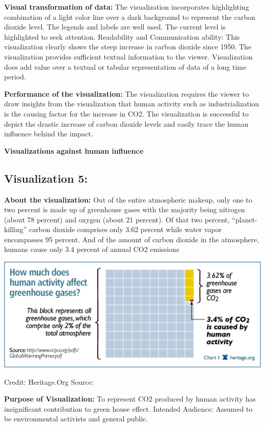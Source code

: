 \documentclass[]{book}
\begin{document}
\textbf{Visual transformation of data:} The visualization incorporates highlighting combination of a light color line over a dark background to represent the carbon dioxide level. The legends and labels are well used. The current level is highlighted to seek attention.
Readability and Communication ability: This visualization clearly shows the steep increase in carbon dioxide since 1950. The visualization provides sufficient textual information to the viewer. Visualization does add value over a textual or tabular representation of data of a long time period.

\textbf{Performance of the visualization:} The visualization requires the viewer to draw insights from the visualization that human activity such as industrialization is the causing factor for the increase in CO2. The visualization is successful to depict the drastic increase of carbon dioxide levels and easily trace the human influence behind the impact.

\textbf{Visualizations against human influence}

\hypertarget{visualization-5}{%
\subsection{Visualization 5:}\label{visualization-5}}

\textbf{About the visualization:} Out of the entire atmospheric makeup, only one to two percent is made up of greenhouse gases with the majority being nitrogen (about 78 percent) and oxygen (about 21 percent). Of that two percent, ``planet-killing'' carbon dioxide comprises only 3.62 percent while water vapor encompasses 95 percent. And of the amount of carbon dioxide in the atmosphere, humans cause only 3.4 percent of annual CO2 emissions

\includegraphics{images/Vz5-Against.png}

Credit: Heritage.Org
Source: \citep{NotHuman}

\textbf{Purpose of Visualization:} To represent CO2 produced by human activity has insignificant contribution to green house effect.
Intended Audience: Assumed to be environmental activists and general public.
\end{document}
